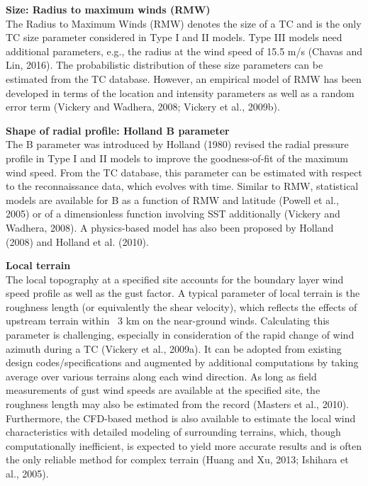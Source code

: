 \noindent\textbf{Size: Radius to maximum winds (RMW)} \\The Radius to Maximum Winds (RMW) denotes the size of a TC and is the only TC size parameter considered in Type I and II models. Type III models need additional parameters, e.g., the radius at the wind speed of 15.5 m/s (Chavas and Lin, 2016). The probabilistic distribution of these size parameters can be estimated from the TC database. However, an empirical model of RMW has been developed in terms of the location and intensity parameters as well as a random error term (Vickery and Wadhera, 2008; Vickery et al., 2009b).
\newline

\noindent\textbf{Shape of radial profile: Holland B parameter} \\The B parameter was introduced by Holland (1980) revised the radial pressure profile in Type I and II models to improve the goodness-of-fit of the maximum wind speed. From the TC database, this parameter can be estimated with respect to the reconnaissance data, which evolves with time. Similar to RMW, statistical models are available for B as a function of RMW and latitude (Powell et al., 2005) or of a dimensionless function involving SST additionally (Vickery and Wadhera, 2008). A physics-based model has also been proposed by Holland (2008) and Holland et al. (2010).
\newline

\noindent\textbf{Local terrain} \\The local topography at a specified site accounts for the boundary layer wind speed profile as well as the gust factor. A typical parameter of local terrain is the roughness length (or equivalently the shear velocity), which reflects the effects of upstream terrain within ~3 km on the near-ground winds. Calculating this parameter is challenging, especially in consideration of the rapid change of wind azimuth during a TC (Vickery et al., 2009a). It can be adopted from existing design codes/specifications and augmented by additional computations by taking average over various terrains along each wind direction. As long as field measurements of gust wind speeds are available at the specified site, the roughness length may also be estimated from the record (Masters et al., 2010). Furthermore, the CFD-based method is also available to estimate the local wind characteristics with detailed modeling of surrounding terrains, which, though computationally inefficient, is expected to yield more accurate results and is often the only reliable method for complex terrain (Huang and Xu, 2013; Ishihara et al., 2005). 
\newline

